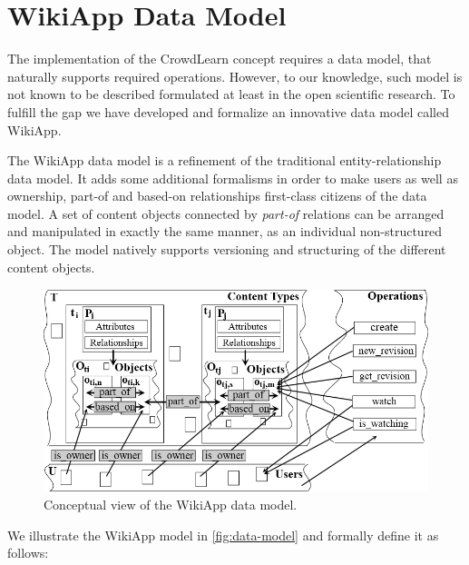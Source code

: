 \documentclass[ngerman,UKenglish,table]{scrbook}
\begin{document}
\section{WikiApp Data Model}
\label{sec:wikiapp}
The implementation of the CrowdLearn concept requires a data model, that naturally supports required operations. 
However, to our knowledge, such model is not known to be described formulated at least in the open scientific research.
To fulfill the gap we have developed and formalize an innovative data model called WikiApp.

The WikiApp data model is a refinement of the traditional entity-relationship data model.
It adds some additional formalisms in order to make users as well as ownership, part-of and based-on relationships first-class citizens of the data model.
A set of content objects connected by \emph{part-of} relations can be arranged and manipulated in exactly the same manner, as an individual non-structured object.
The model natively supports versioning and structuring of the different content objects.

\begin{figure}[htb]
	\centering
		\includegraphics[width=\columnwidth]{images/data_model_last.png}
	\caption{Conceptual view of the WikiApp data model.}
	\label{fig:data-model}
\end{figure}

We illustrate the WikiApp model in \autoref{fig:data-model} and formally define it as follows:
\end{document}
